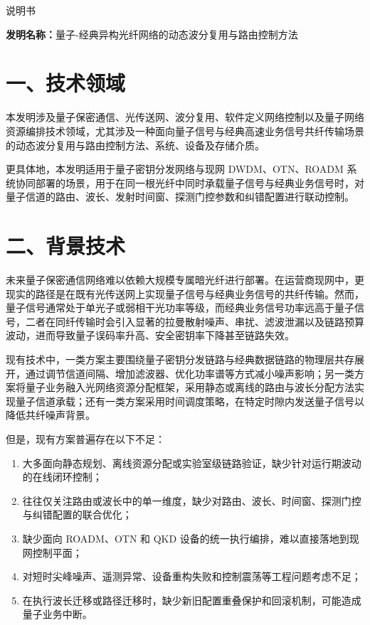 \documentclass[12pt,a4paper]{article}
\begin{document}
\begin{center}
    {\Huge\heiti 说明书}
\end{center}

\vspace{1em}

\noindent\textbf{发明名称：}量子-经典异构光纤网络的动态波分复用与路由控制方法

\section*{一、技术领域}

本发明涉及量子保密通信、光传送网、波分复用、软件定义网络控制以及量子网络资源编排技术领域，尤其涉及一种面向量子信号与经典高速业务信号共纤传输场景的动态波分复用与路由控制方法、系统、设备及存储介质。

更具体地，本发明适用于量子密钥分发网络与现网 DWDM、OTN、ROADM 系统协同部署的场景，用于在同一根光纤中同时承载量子信号与经典业务信号时，对量子信道的路由、波长、发射时间窗、探测门控参数和纠错配置进行联动控制。

\section*{二、背景技术}

未来量子保密通信网络难以依赖大规模专属暗光纤进行部署。在运营商现网中，更现实的路径是在既有光传送网上实现量子信号与经典业务信号的共纤传输。然而，量子信号通常处于单光子或弱相干光功率等级，而经典业务信号功率远高于量子信号，二者在同纤传输时会引入显著的拉曼散射噪声、串扰、滤波泄漏以及链路预算波动，进而导致量子误码率升高、安全密钥率下降甚至链路失效。

现有技术中，一类方案主要围绕量子密钥分发链路与经典数据链路的物理层共存展开，通过调节信道间隔、增加滤波器、优化功率谱等方式减小噪声影响；另一类方案将量子业务融入光网络资源分配框架，采用静态或离线的路由与波长分配方法实现量子信道承载；还有一类方案采用时间调度策略，在特定时隙内发送量子信号以降低共纤噪声背景。

但是，现有方案普遍存在以下不足：
\begin{enumerate}[leftmargin=2em]
    \item 大多面向静态规划、离线资源分配或实验室级链路验证，缺少针对运行期波动的在线闭环控制；
    \item 往往仅关注路由或波长中的单一维度，缺少对路由、波长、时间窗、探测门控与纠错配置的联合优化；
    \item 缺少面向 ROADM、OTN 和 QKD 设备的统一执行编排，难以直接落地到现网控制平面；
    \item 对短时尖峰噪声、遥测异常、设备重构失败和控制震荡等工程问题考虑不足；
    \item 在执行波长迁移或路径迁移时，缺少新旧配置重叠保护和回滚机制，可能造成量子业务中断。
\end{enumerate}
\end{document}
